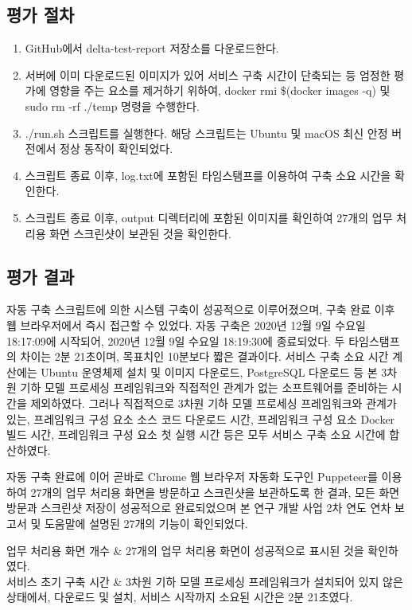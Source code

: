 \documentclass[11pt,oneside,openany,itemph,a4paper,chapter]{oblivoir}
\newenvironment{tablekeyvalue}[2]
{\bgroup
\table[H] \tabularx{\linewidth}{|
>{\setlength{\baselineskip}{1.2\baselineskip}}P{#1\linewidth}|
>{\setlength{\baselineskip}{1.2\baselineskip}}P{#2\linewidth}|}
\hline}
{\endtabularx \endtable \egroup}
\begin{document}
\subsection{평가 절차}
\begin{enumerate}
    \item GitHub에서 delta-test-report 저장소를 다운로드한다.
    \item 서버에 이미 다운로드된 이미지가 있어 서비스 구축 시간이 단축되는 등 엄정한 평가에 영향을 주는 요소를 제거하기 위하여, docker rmi \$(docker images -q) 및 sudo rm -rf ./temp 명령을 수행한다.
    \item ./run.sh 스크립트를 실행한다. 해당 스크립트는 Ubuntu 및 macOS 최신 안정 버전에서 정상 동작이 확인되었다.
    \item 스크립트 종료 이후, log.txt에 포함된 타임스탬프를 이용하여 구축 소요 시간을 확인한다.
    \item 스크립트 종료 이후, output 디렉터리에 포함된 이미지를 확인하여 27개의 업무 처리용 화면 스크린샷이 보관된 것을 확인한다.
\end{enumerate}

\subsection{평가 결과}
자동 구축 스크립트에 의한 시스템 구축이 성공적으로 이루어졌으며, 구축 완료 이후 웹 브라우저에서 즉시 접근할 수 있었다. 자동 구축은 2020년 12월 9일 수요일 18:17:09에 시작되어, 2020년 12월 9일 수요일 18:19:30에 종료되었다. 두 타임스탬프의 차이는 2분 21초이며, 목표치인 10분보다 짧은 결과이다. 서비스 구축 소요 시간 계산에는 Ubuntu 운영체제 설치 및 이미지 다운로드, PostgreSQL 다운로드 등 본 3차원 기하 모델 프로세싱 프레임워크와 직접적인 관계가 없는 소프트웨어를 준비하는 시간을 제외하였다. 그러나 직접적으로 3차원 기하 모델 프로세싱 프레임워크와 관계가 있는, 프레임워크 구성 요소 소스 코드 다운로드 시간, 프레임워크 구성 요소 Docker 빌드 시간, 프레임워크 구성 요소 첫 실행 시간 등은 모두 서비스 구축 소요 시간에 합산하였다.

자동 구축 완료에 이어 곧바로 Chrome 웹 브라우저 자동화 도구인 Puppeteer를 이용하여 27개의 업무 처리용 화면을 방문하고 스크린샷을 보관하도록 한 결과, 모든 화면 방문과 스크린샷 저장이 성공적으로 완료되었으며 본 연구 개발 사업 2차 연도 연차 보고서 및 도움말에 설명된 27개의 기능이 확인되었다.

\begin{tablekeyvalue}{0.3}{0.7}
    업무 처리용 화면 개수 & 27개의 업무 처리용 화면이 성공적으로 표시된 것을 확인하였다. \\ \hline
    서비스 초기 구축 시간 & 3차원 기하 모델 프로세싱 프레임워크가 설치되어 있지 않은 상태에서, 다운로드 및 설치, 서비스 시작까지 소요된 시간은 2분 21초였다. \\ \hline
\end{tablekeyvalue}
\end{document}
